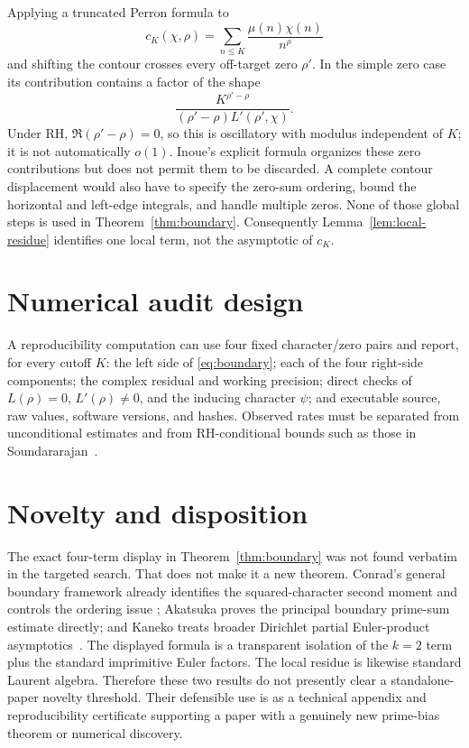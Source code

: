 \documentclass[11pt]{article}
\begin{document}
Applying a truncated Perron formula to
\[
 c_K(\chi,\rho)=\sum_{n\le K}\frac{\mu(n)\chi(n)}{n^\rho}
\]
and shifting the contour crosses every off-target zero $\rho'$.  In the simple
zero case its contribution contains a factor of the shape
\begin{equation}
 \frac{K^{\rho'-\rho}}
      {(\rho'-\rho)L'(\rho',\chi)}.
\end{equation}
Under RH, $\Re(\rho'-\rho)=0$, so this is oscillatory with modulus independent
of $K$; it is not automatically $o(1)$.  Inoue's explicit formula
\cite{Inoue2021} organizes these zero contributions but does not permit them
to be discarded.  A complete contour displacement would also have to specify
the zero-sum ordering, bound the horizontal and left-edge integrals, and handle
multiple zeros.  None of those global steps is used in
Theorem~\ref{thm:boundary}.  Consequently Lemma~\ref{lem:local-residue}
identifies one local term, not the asymptotic of $c_K$.

\section{Numerical audit design}

A reproducibility computation can use four fixed character/zero pairs and
report, for every cutoff $K$: the left side of \eqref{eq:boundary}; each of
the four right-side components; the complex residual and working precision;
direct checks of $L(\rho)=0$, $L'(\rho)\ne0$, and the inducing character
$\psi$; and executable source, raw values, software versions, and hashes.
Observed rates must be separated from unconditional estimates and from
RH-conditional bounds such as those in Soundararajan~\cite{Soundararajan2009}.

\section{Novelty and disposition}

The exact four-term display in Theorem~\ref{thm:boundary} was not found
verbatim in the targeted search.  That does not make it a new theorem.
Conrad's general boundary framework already identifies the squared-character
second moment and controls the ordering issue
\cite[Example~4.6 and Theorem~4.9]{Conrad2005PartialEuler}; Akatsuka proves the
principal boundary prime-sum estimate directly; and Kaneko treats broader
Dirichlet partial Euler-product asymptotics~\cite{Kaneko2022DirichletEuler}.
The displayed formula is a transparent isolation of the $k=2$ term plus the
standard imprimitive Euler factors.  The local residue is likewise standard
Laurent algebra.  Therefore these two results do not presently clear a
standalone-paper novelty threshold.  Their defensible use is as a technical
appendix and reproducibility certificate supporting a paper with a genuinely
new prime-bias theorem or numerical discovery.
\end{document}
